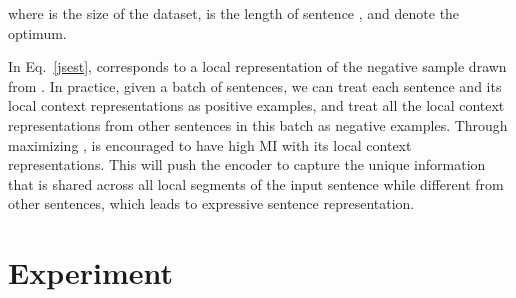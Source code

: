 \documentclass[11pt,a4paper]{article}
\begin{document}
where  is the size of the dataset,  is the length of sentence , and  denote the optimum. 

In Eq.~\ref{jsest},  corresponds to a local representation of the negative sample  drawn from . In practice, given a batch of sentences, we can treat each sentence and its local context representations as positive examples, and treat all the local context representations from other sentences in this batch as negative examples. Through maximizing ,  is encouraged to have high MI with its local context representations. 
This will push the encoder to capture the unique information that is shared across all local segments of the input sentence while different from other sentences, which leads to expressive sentence representation.




%
 \section{Experiment}
\end{document}
